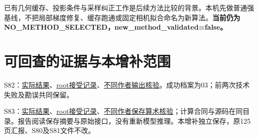 \documentclass[UTF8,11pt,a4paper]{ctexart}
\begin{document}
已有几何缓存、投影条件与采样纠正工作是后续方法比较的背景。本机先做普通强基线，不把局部梯度修复、缓存跑通或固定相机拟合命名为新算法。\textbf{当前仍为NO\_METHOD\_SELECTED，new\_method\_validated=false。}

\section{ 可回查的证据与本增补范围}
S82：\href{/Users/rocket/Desktop/HKUST\%20IT/ip-/geometry-world-modeling/work/S82_history_geometry_guidance/S82_RESULTS.md}{实际结果}、\href{/Users/rocket/Desktop/HKUST\%20IT/ip-/geometry-world-modeling/work/S82_history_geometry_guidance/ROOT_GEOMETRY_RESULT_ACCEPTANCE.json}{root接受记录}、\href{/Users/rocket/Desktop/HKUST\%20IT/ip-/geometry-world-modeling/work/S82_history_geometry_guidance/GEOMETRY_OUTPUT_REVIEW.json}{不同作者输出核验}。成功档案为03；前两次技术失败及勘误共同保留。

S83：\href{/Users/rocket/Desktop/HKUST\%20IT/ip-/geometry-world-modeling/work/S83_fixed_camera_geometry/S83_RESULTS.md}{实际结果}、\href{/Users/rocket/Desktop/HKUST\%20IT/ip-/geometry-world-modeling/work/S83_fixed_camera_geometry/ROOT_RESULT_ACCEPTANCE.json}{root接受记录}、\href{/Users/rocket/Desktop/HKUST\%20IT/ip-/geometry-world-modeling/work/S83_fixed_camera_geometry/OUTPUT_REVIEW.json}{不同作者保存算术核验}；计算合同与源码在同目录。报告阅读保存摘要与原始接口，没有重新模型推理。本增补独立保存，原125页汇报、S80及S81文件不改。
\end{document}
